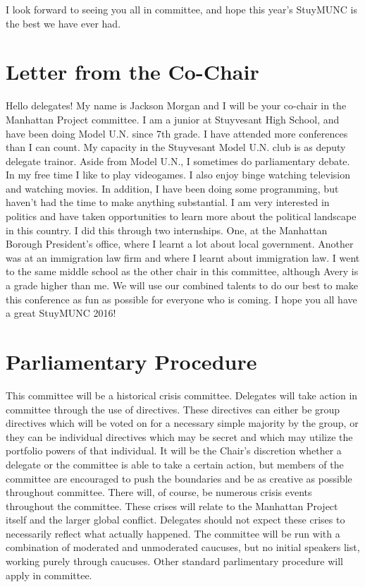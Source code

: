 \documentclass[11 pt, twoside]{article}
\begin{document}
I look forward to seeing you all in committee, and hope this year's StuyMUNC is the best we have ever had.

\section{Letter from the Co-Chair}
	Hello delegates! My name is Jackson Morgan and I will be your co-chair in the Manhattan Project committee. I am a junior at Stuyvesant High School, and have been doing Model U.N. since 7th grade. I have attended more conferences than I can count. My capacity in the Stuyvesant Model U.N. club is as deputy delegate trainor. Aside from Model U.N., I sometimes do parliamentary debate. In my free time I like to play videogames. I also enjoy binge watching television and watching movies. In addition, I have been doing some programming, but haven’t had the time to make anything substantial.
	I am very interested in politics and have taken opportunities to learn more about the political landscape in this country. I did this through two internships. One, at the Manhattan Borough President’s office, where I learnt a lot about local government. Another was at an immigration law firm and where I learnt about immigration law. 	
	I went to the same middle school as the other chair in this committee, although Avery is a grade higher than me. We will use our combined talents to do our best to make this conference as fun as possible for everyone who is coming. I hope you all have a great StuyMUNC 2016!

\section{Parliamentary Procedure}
	This committee will be a historical crisis committee. Delegates will take action in committee through the use of directives. These directives can either be group directives which will be voted on for a necessary simple majority by the group, or they can be individual directives which may be secret and which may utilize the portfolio powers of that individual. It will be the Chair’s discretion whether a delegate or the committee is able to take a certain action, but members of the committee are encouraged to push the boundaries and be as creative as possible throughout committee. There will, of course, be numerous crisis events throughout the committee. These crises will relate to the Manhattan Project itself and the larger global conflict. Delegates should not expect these crises to necessarily reflect what actually happened. The committee will be run with a combination of moderated and unmoderated caucuses, but no initial speakers list, working purely through caucuses. Other standard parlimentary procedure will apply in committee.
\end{document}
